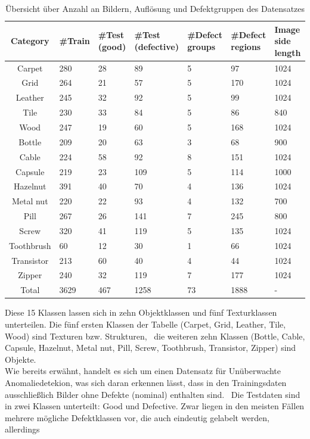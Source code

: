 \begin{table}[h]
  \centering
  \begin{tabular}{|c|p{1.8cm}|p{1.8cm}|p{1.8cm}|p{1.8cm}|p{1.8cm}|p{1.8cm}|}
  \hline
  Category & \#Train & \#Test (good) & \#Test (defective) & \#Defect groups & \#Defect regions & Image side length  \\
  \hline
  Carpet & 280 & 28 & 89 & 5 & 97 & 1024 \\ 
  Grid & 264 & 21 & 57 & 5 & 170 & 1024 \\
  Leather & 245 & 32 & 92 & 5 & 99 & 1024 \\ 
  Tile & 230 & 33 & 84 & 5 & 86 & 840 \\
  Wood & 247 & 19 & 60 & 5 & 168 & 1024  \\ 
  Bottle & 209 & 20 & 63 & 3 & 68 & 900 \\
  Cable & 224 & 58 & 92 & 8 & 151 & 1024 \\ 
  Capsule & 219 & 23 & 109 & 5 & 114 & 1000 \\
  Hazelnut & 391 & 40 & 70 & 4 & 136 & 1024 \\ 
  Metal nut & 220 & 22 & 93 & 4 & 132 & 700 \\
  Pill & 267 & 26 & 141 & 7 & 245 & 800 \\ 
  Screw & 320 & 41 & 119 & 5 & 135 & 1024 \\
  Toothbrush & 60 & 12 & 30 & 1 & 66 & 1024 \\ 
  Transistor & 213 & 60 & 40 & 4 & 44 & 1024 \\
  Zipper & 240 & 32 & 119 & 7 & 177 & 1024 \\
  \hline
  Total & 3629 & 467 & 1258 & 73 & 1888 & - \\
  \hline
  \end{tabular}
  \caption{Übersicht über Anzahl an Bildern, Auflösung und Defektgruppen des Datensatzes}
  \label{tab:mvtecad_overview}
\end{table}
Diese 15 Klassen lassen sich in zehn Objektklassen und fünf Texturklassen unterteilen. Die fünf ersten Klassen der Tabelle (Carpet, Grid, Leather, Tile, Wood) sind Texturen bzw. Strukturen, \
die weiteren zehn Klassen (Bottle, Cable, Capsule, Hazelnut, Metal nut, Pill, Screw, Toothbrush, Transistor, Zipper) sind Objekte. \\
Wie bereits erwähnt, handelt es sich um einen Datensatz für Unüberwachte Anomaliedetekion, was sich daran erkennen lässt, dass in den Trainingsdaten ausschließlich Bilder ohne Defekte (nominal) enthalten sind. \
Die Testdaten sind in zwei Klassen unterteilt: \glqq Good\grqq{} und \glqq Defective\grqq{}. Zwar liegen in den meisten Fällen mehrere mögliche Defektklassen vor, die auch eindeutig gelabelt werden, allerdings \
